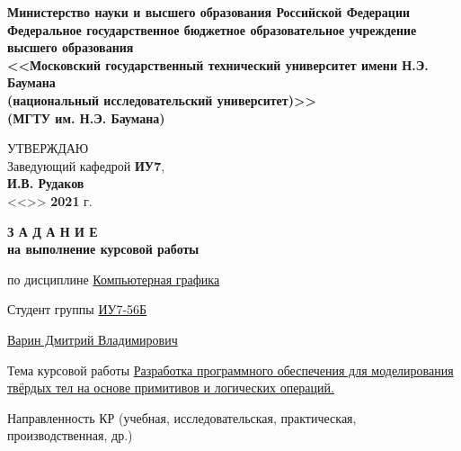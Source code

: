 \thispagestyle{empty}
\begin{center}
    \fontsize{11pt}{0.3\baselineskip}\selectfont \textbf{Министерство науки и высшего образования Российской Федерации \\ Федеральное государственное бюджетное образовательное учреждение \\ высшего образования \\ <<Московский государственный технический университет имени Н.Э. Баумана \\ (национальный исследовательский университет)>> \\ (МГТУ им. Н.Э. Баумана)}
    \makebox[\linewidth]{\rule{\textwidth}{3pt}}
    \begin{flushright}
        \fontsize{11pt}{0.5\baselineskip}\selectfont
            УТВЕРЖДАЮ \\ Заведующий кафедрой \textbf{ИУ7}, \\
            \uline{\mbox{\hspace*{2cm}}}
            \textbf{И.В. Рудаков} \\
            <<\uline{\mbox{\hspace*{1cm}}}>>
            \uline{\mbox{\hspace*{2.5cm}}}
            \textbf{2021} г.
    \end{flushright}
\end{center}


\begin{center}
    \fontsize{18pt}{0.6\baselineskip}\selectfont \textbf{З А Д А Н И Е}\\
    \fontsize{16pt}{0.6\baselineskip}\selectfont \textbf{на выполнение курсовой работы}
\end{center}

\normalsize

\begingroup
\fontsize{12pt}{0.5\baselineskip}\selectfont
\setlength{\parskip}{0.1em}
\setlength{\parindent}{0em}
по дисциплине \uline{\hfill Компьютерная графика \hfill}

Студент группы \uline{\hfill ИУ7-56Б \hfill}

\uline{\hfill Варин Дмитрий Владимирович \hfill}

Тема курсовой работы \uline{Разработка программного обеспечения для моделирования твёрдых тел на основе примитивов и логических операций.\hfill}

Направленность КР (учебная, исследовательская, практическая, производственная, др.)

